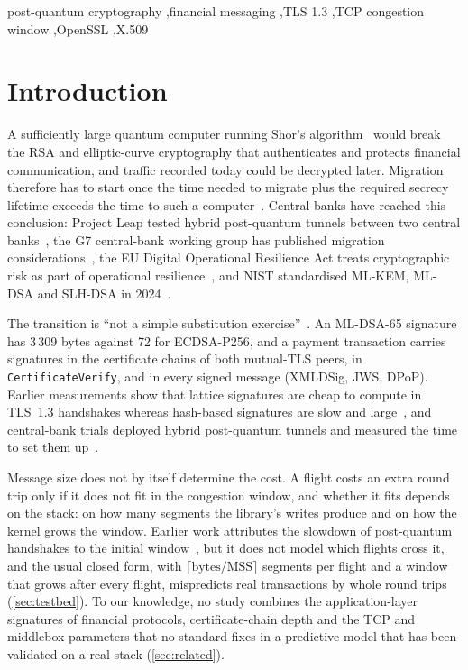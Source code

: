 \documentclass[preprint,12pt]{elsarticle}
\begin{document}
\begin{frontmatter}
\begin{keyword}
post-quantum cryptography \sep financial messaging \sep TLS 1.3 \sep TCP congestion window \sep OpenSSL \sep X.509
\end{keyword}
\end{frontmatter}

\section{Introduction}
\label{sec:intro}

A sufficiently large quantum computer running Shor's algorithm~\cite{shor1994} would break the RSA and elliptic-curve cryptography that authenticates and protects financial communication, and traffic recorded today could be decrypted later. Migration therefore has to start once the time needed to migrate plus the required secrecy lifetime exceeds the time to such a computer~\cite{mosca2018}. Central banks have reached this conclusion: Project Leap tested hybrid post-quantum tunnels between two central banks~\cite{bis_leap2023}, the G7 central-bank working group has published migration considerations~\cite{g7qtwg2026}, the EU Digital Operational Resilience Act treats cryptographic risk as part of operational resilience~\cite{dora2022}, and NIST standardised ML-KEM, ML-DSA and SLH-DSA in 2024~\cite{fips203,fips204,fips205}.

The transition is ``not a simple substitution exercise''~\cite{g7qtwg2026}. An ML-DSA-65 signature has 3\,309 bytes against 72 for ECDSA-P256, and a payment transaction carries signatures in the certificate chains of both mutual-TLS peers, in \texttt{CertificateVerify}, and in every signed message (XMLDSig, JWS, DPoP). Earlier measurements show that lattice signatures are cheap to compute in TLS~1.3 handshakes whereas hash-based signatures are slow and large~\cite{sikeridis2020,paquin2020,raavi2025}, and central-bank trials deployed hybrid post-quantum tunnels and measured the time to set them up~\cite{bis_leap2023,bdf2022}.

Message size does not by itself determine the cost. A flight costs an extra round trip only if it does not fit in the congestion window, and whether it fits depends on the stack: on how many segments the library's writes produce and on how the kernel grows the window. Earlier work attributes the slowdown of post-quantum handshakes to the initial window~\cite{sikeridis2020,sikeridis2020b,westerbaan2021}, but it does not model which flights cross it, and the usual closed form, with $\lceil\text{bytes}/\text{MSS}\rceil$ segments per flight and a window that grows after every flight, mispredicts real transactions by whole round trips (\cref{sec:testbed}). To our knowledge, no study combines the application-layer signatures of financial protocols, certificate-chain depth and the TCP and middlebox parameters that no standard fixes in a predictive model that has been validated on a real stack (\cref{sec:related}).
\end{document}
